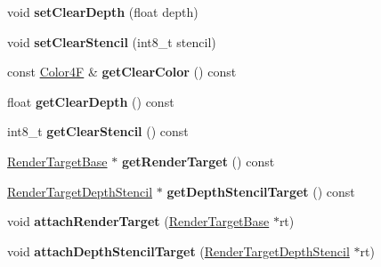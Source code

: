 \begin{DoxyCompactItemize}
void {\bfseries set\+Clear\+Depth} (float depth)
\item 
\mbox{\label{classexperimental_1_1FrameBuffer_afb038661222d25d168eae886cb5e342d}} 
void {\bfseries set\+Clear\+Stencil} (int8\+\_\+t stencil)
\item 
\mbox{\label{classexperimental_1_1FrameBuffer_a3dcd70eae0dbb12185cd198ed58a8c9d}} 
const \hyperlink{structColor4F}{Color4F} \& {\bfseries get\+Clear\+Color} () const
\item 
\mbox{\label{classexperimental_1_1FrameBuffer_ac21ecb9651c037149922ad8aee83b804}} 
float {\bfseries get\+Clear\+Depth} () const
\item 
\mbox{\label{classexperimental_1_1FrameBuffer_a449e2cfd27461b9123e09afbcbdabe8b}} 
int8\+\_\+t {\bfseries get\+Clear\+Stencil} () const
\item 
\mbox{\label{classexperimental_1_1FrameBuffer_a6a0ef0e42f136d476416b22c091db287}} 
\hyperlink{classexperimental_1_1RenderTargetBase}{Render\+Target\+Base} $\ast$ {\bfseries get\+Render\+Target} () const
\item 
\mbox{\label{classexperimental_1_1FrameBuffer_a6ef25b8f72bc5a486461d37cd3b57d9c}} 
\hyperlink{classexperimental_1_1RenderTargetDepthStencil}{Render\+Target\+Depth\+Stencil} $\ast$ {\bfseries get\+Depth\+Stencil\+Target} () const
\item 
\mbox{\label{classexperimental_1_1FrameBuffer_aeea20574ccdc00a87706f63c15685889}} 
void {\bfseries attach\+Render\+Target} (\hyperlink{classexperimental_1_1RenderTargetBase}{Render\+Target\+Base} $\ast$rt)
\item 
\mbox{\label{classexperimental_1_1FrameBuffer_a456836db4f748c21fc0a50aeace66943}} 
void {\bfseries attach\+Depth\+Stencil\+Target} (\hyperlink{classexperimental_1_1RenderTargetDepthStencil}{Render\+Target\+Depth\+Stencil} $\ast$rt)
\item 
\mbox{\label{classexperimental_1_1FrameBuffer_aef3f2e321b01d57f89b34e5634ac1dae}} 

\end{DoxyCompactItemize}
